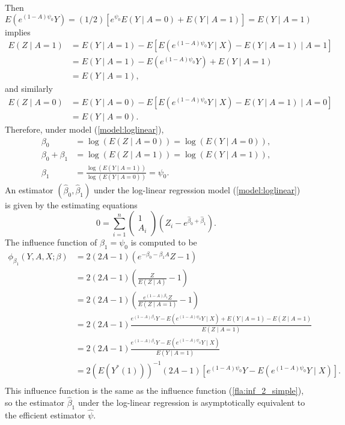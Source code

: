 \message{ !name(manuscript.tex)}\documentclass[10pt,a4paper]{amsart}
\newcommand{\EE}{E}
\begin{document}
Then
\[
  \EE(e^{(1-A)\psi_0}Y) = (1/2)[e^{\psi_0}\EE(Y\mid A=0) + \EE(Y\mid A=1)] = \EE(Y\mid A=1)
\]
implies
\begin{align*}
  \EE(Z\mid A=1) &= \EE(Y\mid A=1) - \EE[\EE(e^{(1-A)\psi_0}Y\mid X) - \EE(Y\mid A=1) \mid A=1]\\
                 &= \EE(Y\mid A=1) - \EE(e^{(1-A)\psi_0}Y) + \EE(Y\mid A=1)\\
                 &= \EE(Y\mid A=1),
\end{align*}
and similarly
\begin{align*}
  \EE(Z\mid A=0) &= \EE(Y\mid A=0) - \EE[\EE(e^{(1-A)\psi_0}Y\mid X) - \EE(Y\mid A=1) \mid A=0]\\
                 &= \EE(Y\mid A=0).
\end{align*}
Therefore, under model (\ref{model:loglinear}),
\begin{align*}
  \beta_0 &= \log(\EE(Z\mid A = 0)) = \log(\EE(Y\mid A = 0)),\\
  \beta_0 + \beta_1 &= \log(\EE(Z\mid A = 1)) = \log(\EE(Y\mid A = 1
                      )),\\
  \beta_1 &= \frac{\log(\EE(Y\mid A = 1))}{\log(\EE(Y\mid A = 0))} = \psi_0.
\end{align*}
An estimator $(\hat{\beta}_0, \hat{\beta}_1)$ under the log-linear
regression model (\ref{model:loglinear}) is given by the estimating equations
\[
  0 = \sum_{i=1}^n \begin{pmatrix} 1 \\ A_i \end{pmatrix}(Z_i - e^{\hat{\beta}_0 + \hat{\beta}_1}).
\]
The influence function of $\beta_1=\psi_0$ is computed to be
\begin{align*}
  \phi_{\beta_1}(Y,A,X;\beta) &= 2(2A-1)(e^{-\beta_0-\beta_1A}Z - 1)\\
                    &= 2(2A-1)\left(\frac{Z}{\EE(Z\mid A)} - 1\right)\\
                    &= 2(2A-1)\left(\frac{e^{(1-A)\beta_1}Z}{\EE(Z\mid A=1)} - 1\right)\\
                    &= 2(2A-1)\frac{e^{(1-A)\beta_1}Y - \EE(e^{(1-A)\psi_0}Y\mid X) + \EE(Y\mid A=1) - \EE(Z\mid A=1)}{\EE(Z\mid A=1)}\\
                    &= 2(2A-1)\frac{e^{(1-A)\beta_1}Y - \EE(e^{(1-A)\psi_0}Y\mid X)}{\EE(Y\mid A=1)}\\
                    &= 2(\EE(Y^*(1)))^{-1}(2A-1)[e^{(1-A)\psi_0}Y - \EE(e^{(1-A)\psi_0}Y\mid X)].\\
\end{align*}
This influence function is the same as the influence function
(\ref{fla:inf_2_simple}), so the estimator $\hat{\beta}_1$
under the log-linear regression is asymptotically equivalent to the
efficient estimator $\hat{\psi}$.
\end{document}
